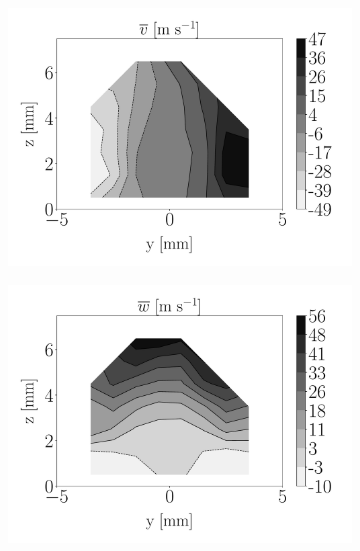 \begin{figure}[h!]
\begin{subfigure}[b]{0.2\textwidth}
\end{subfigure}
\hspace*{0.45in}
\begin{subfigure}[b]{0.2\textwidth}
	\flushleft
   \includegraphics[scale=0.19]{./part2_developments/figures_ch6_lagrangian_JICF/injectors_SLI/uG100_dx10_x05_uy_mean_map}
\end{subfigure}
\hspace*{0.35in}
\begin{subfigure}[b]{0.2\textwidth}
	\flushleft
   \includegraphics[scale=0.19]{./part2_developments/figures_ch6_lagrangian_JICF/injectors_SLI/uG100_dx10_x05_uz_mean_map}
\end{subfigure}


\end{figure}
